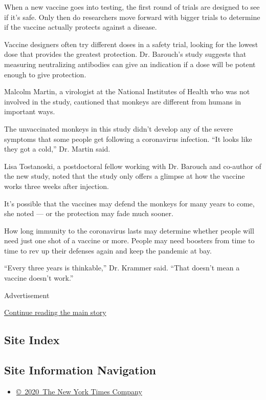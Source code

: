 When a new vaccine goes into testing, the first round of trials are
designed to see if it's safe. Only then do researchers move forward with
bigger trials to determine if the vaccine actually protects against a
disease.

Vaccine designers often try different doses in a safety trial, looking
for the lowest dose that provides the greatest protection. Dr. Barouch's
study suggests that measuring neutralizing antibodies can give an
indication if a dose will be potent enough to give protection.

Malcolm Martin, a virologist at the National Institutes of Health who
was not involved in the study, cautioned that monkeys are different from
humans in important ways.

The unvaccinated monkeys in this study didn't develop any of the severe
symptoms that some people get following a coronavirus infection. ``It
looks like they got a cold,'' Dr. Martin said.

Lisa Tostanoski, a postdoctoral fellow working with Dr. Barouch and
co-author of the new study, noted that the study only offers a glimpse
at how the vaccine works three weeks after injection.

It's possible that the vaccines may defend the monkeys for many years to
come, she noted --- or the protection may fade much sooner.

How long immunity to the coronavirus lasts may determine whether people
will need just one shot of a vaccine or more. People may need boosters
from time to time to rev up their defenses again and keep the pandemic
at bay.

``Every three years is thinkable,'' Dr. Krammer said. ``That doesn't
mean a vaccine doesn't work.''

Advertisement

\protect\hyperlink{after-bottom}{Continue reading the main story}

\hypertarget{site-index}{%
\subsection{Site Index}\label{site-index}}

\hypertarget{site-information-navigation}{%
\subsection{Site Information
Navigation}\label{site-information-navigation}}

\begin{itemize}
\tightlist
\item
  \href{https://help.nytimes.com/hc/en-us/articles/115014792127-Copyright-notice}{©~2020~The
  New York Times Company}
\end{itemize}

